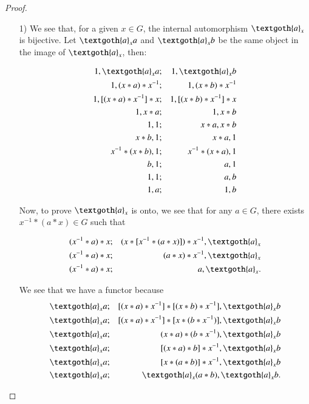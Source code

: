 \documentclass [12pt]{book}
\begin{document}
\begin{proof}\makebox[5pt][]{}\mbox {}

\begin{itemize}\item[1)]We see that, for a given $x\in G$, the internal automorphism $\textgoth{a}_{x}$ is bijective. Let $\textgoth{a}_{x}a$ and $\textgoth{a}_{x}b$ be the same object in the image of $\textgoth{a}_{x}$, then:

\begin{eqnarray}\nonumber1,\textgoth{a}_{x}a&;&1,\textgoth{a}_{x}b\\\nonumber1,(x*a)*x^{-1}&;&1,(x*b)*x^{-1}\\\nonumber 1,[(x*a)*x^{-1}]*x&;&1,[(x*b)*x^{-1}]*x\\\nonumber 1,x*a&;&1
,x*b\\\nonumber 1,1&;&x*a
,x*b\\\nonumber x*b,1&;&x*a,1\\\nonumber x^{-1}*(x*b),1&;&x^{-1}*(x*a),1\\\nonumber b,1&;&a,1\\\nonumber 1,1&;&a,b\\\nonumber 1,a&;&1,b\end{eqnarray}

Now, to prove $\textgoth{a}_{x}$ is onto, we see that for any $a\in G$, there exists $x^{-1}*(a*x)\in G$ such that 

\begin{eqnarray}\nonumber (x^{-1}*a)*x&;&(x*[x^{-1}*(a*x)])*x^{-1},\textgoth{a}_{x}\\\nonumber (x^{-1}*a)*x&;&(a*x)*x^{-1},\textgoth{a}_{x}\\\nonumber (x^{-1}*a)*x&;&a,\textgoth{a}_{x}.\end{eqnarray}

We see that we have a functor because\begin{eqnarray}\nonumber \textgoth{a}_{x}a&;&[(x*a)*x^{-1}]*[(x*b)*x^{-1}],\textgoth{a}_{x}b\\\nonumber \textgoth{a}_{x}a&;&[(x*a)*x^{-1}]*[x*(b*x^{-1})],\textgoth{a}_{x}b\\\nonumber \textgoth{a}_{x}a&;&(x*a)*(b*x^{-1}),\textgoth{a}_{x}b\\\nonumber \textgoth{a}_{x}a&;&[(x*a)*b]*x^{-1},\textgoth{a}_{x}b\\\nonumber \textgoth{a}_{x}a&;&[x*(a*b)]*x^{-1},\textgoth{a}_{x}b\\\nonumber \textgoth{a}_{x}a&;&\textgoth{a}_{x}(a*b),\textgoth{a}_{x}b.\end{eqnarray}


\end{itemize}
\end{proof}
\end{document}
